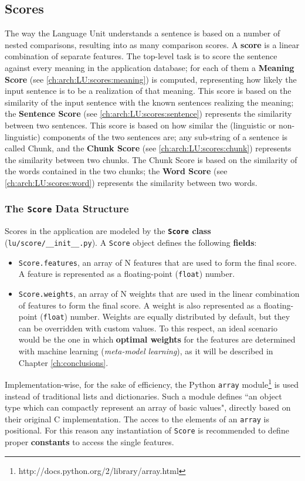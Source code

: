 \subsection{Scores}
The way the Language Unit understands a sentence is based on a number of nested comparisons, resulting into as many comparison scores. A \textbf{score} is a linear combination of separate features. The top-level task is to score the sentence against every meaning in the application database; for each of them a \textbf{Meaning Score} (see \ref{ch:arch:LU:scores:meaning}) is computed, representing how likely the input sentence is to be a realization of that meaning. This score is based on the similarity of the input sentence with the known sentences realizing the meaning; the \textbf{Sentence Score} (see \ref{ch:arch:LU:scores:sentence}) represents the similarity between two sentences. This score is based on how similar the (linguistic or non-linguistic) components of the two sentences are; any sub-string of a sentence is called Chunk, and the \textbf{Chunk Score} (see \ref{ch:arch:LU:scores:chunk}) represents the similarity between two chunks. The Chunk Score is based on the similarity of the words contained in the two chunks; the \textbf{Word Score} (see \ref{ch:arch:LU:scores:word}) represents the similarity between two words.

\subsubsection{The \texttt{Score} Data Structure}
Scores in the application are modeled by the \textbf{\texttt{Score} class} (\texttt{lu/score/\_\_init\_\_.py}). A \texttt{Score} object defines the following \textbf{fields}:
\begin{itemize}
	\item \texttt{Score.features}, an array of N features that are used to form the final score. A feature is represented as a floating-point (\texttt{float}) number.
	\item \texttt{Score.weights}, an array of N weights that are used in the linear combination of features to form the final score. A weight is also represented as a floating-point (\texttt{float}) number. Weights are equally distributed by default, but they can be overridden with custom values. To this respect, an ideal scenario would be the one in which \textbf{optimal weights} for the features are determined with machine learning (\emph{meta-model learning}), as it will be described in Chapter \ref{ch:conclusions}. %
\end{itemize}
Implementation-wise, for the sake of efficiency, the Python \texttt{array} module\footnote{http://docs.python.org/2/library/array.html} is used instead of traditional lists and dictionaries. Such a module defines ``an object type which can compactly represent an array of basic values", directly based on their original C implementation. The acces to the elements of an \texttt{array} is positional. For this reason any instantiation of \texttt{Score} is recommended to define proper \textbf{constants} to access the single features.

